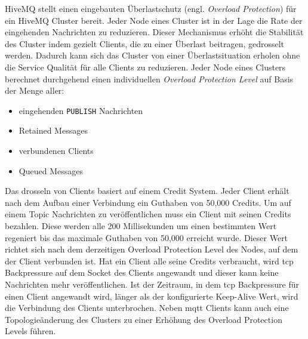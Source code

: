 HiveMQ stellt einen eingebauten Überlastschutz (engl. \textit{Overload Protection}) für ein HiveMQ Cluster bereit. Jeder Node eines Cluster ist in der Lage die Rate der eingehenden Nachrichten zu reduzieren. Dieser Mechanismus erhöht die Stabilität des Cluster indem gezielt Clients, die zu einer Überlast beitragen, gedrosselt werden. Dadurch kann sich das Cluster von einer Überlastsituation erholen ohne die Service Qualität für alle Clients zu reduzieren.
Jeder Node eines Clusters berechnet durchgehend einen individuellen \textit{Overload Protection Level} auf Basis der Menge aller:
\begin{itemize}
    \item eingehenden \verb|PUBLISH| Nachrichten
    \item Retained Messages
    \item verbundenen Clients
    \item Queued Messages
\end{itemize}
Das drosseln von Clients basiert auf einem Credit System. Jeder Client erhält nach dem Aufbau einer Verbindung ein Guthaben von 50,000 Credits. Um auf einem Topic Nachrichten zu veröffentlichen muss ein Client mit seinen Credits bezahlen. Diese werden alle 200 Millisekunden um einen bestimmten Wert regeniert bis das maximale Guthaben von 50,000 erreicht wurde. Dieser Wert richtet sich nach dem derzeitigen Overload Protection Level des Nodes, auf dem der Client verbunden ist.
Hat ein Client alle seine Credits verbraucht, wird \ac{tcp} Backpressure auf dem Socket des Clients angewandt und dieser kann keine Nachrichten mehr veröffentlichen.
Ist der Zeitraum, in dem \ac{tcp} Backpressure für einen Client angewandt wird, länger als der konfigurierte Keep-Alive Wert, wird die Verbindung des Clients unterbrochen.
Neben \ac{mqtt} Clients kann auch eine Topologieänderung des Clusters zu einer Erhöhung des Overload Protection Levels führen.
\cite{ClusterOverloadProtection}


